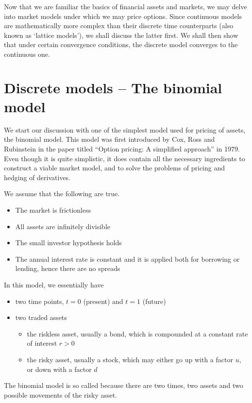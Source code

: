

Now that we are familiar the basics of financial assets and markets, we may delve into market models under which we may price options. Since continuous models are mathematically more complex than their discrete time counterparts (also known as `lattice models'), we shall discuss the latter first. We shall then show that under certain convergence conditions, the discrete model converges to the continuous one.



\section{Discrete models -- The binomial model}
\label{sec:discrete-binom-model}

We start our discussion with one of the simplest model used for pricing of assets, the binomial model. This model was first introduced by Cox, Ross and Rubinstein \cite{Cox1979} in the paper titled ``Option pricing: A simplified approach'' in 1979. Even though it is quite simplistic, it does contain all the necessary ingredients to construct a viable market model, and to solve the problems of pricing and hedging of derivatives.

We assume that the following are true.
\begin{itemize}
	\item The market is frictionless
	\item All assets are infinitely divisible
	\item The small investor hypothesis holds
	\item The annual interest rate is constant and it is applied both for borrowing or lending, hence there are no spreads
\end{itemize}

In this model, we essentially have
\begin{itemize}
	\item two time points, $ t = 0 $ (present) and $ t = 1 $ (future)
	\item two traded assets
	\begin{itemize}
		\item the riskless asset, usually a bond, which is compounded at a constant rate of interest $ r > 0 $
		\item the risky asset, usually a stock, which may either go up with a factor $ u $, or down with a factor $ d $
	\end{itemize}
\end{itemize}
The binomial model is so called because there are two times, two assets and two possible movements of the risky asset.

